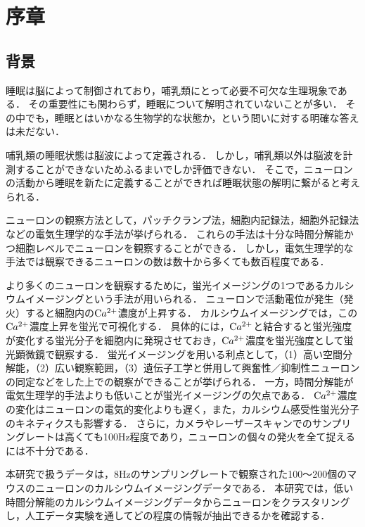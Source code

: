 \chapter{序章}
\section{背景}
睡眠は脳によって制御されており\cite{Hobson2005}，哺乳類にとって必要不可欠な生理現象である．
その重要性にも関わらず，睡眠について解明されていないことが多い．
その中でも，睡眠とはいかなる生物学的な状態か，という問いに対する明確な答えは未だない\cite{Kanda2016}．

哺乳類の睡眠状態は脳波によって定義される．
しかし，哺乳類以外は脳波を計測することができないためふるまいでしか評価できない．
そこで，ニューロンの活動から睡眠を新たに定義することができれば睡眠状態の解明に繋がると考えられる\cite{Kanda2020}．

ニューロンの観察方法として，パッチクランプ法，細胞内記録法，細胞外記録法などの電気生理学的な手法が挙げられる．
これらの手法は十分な時間分解能かつ細胞レベルでニューロンを観察することができる．
しかし，電気生理学的な手法では観察できるニューロンの数は数十から多くても数百程度である．

より多くのニューロンを観察するために，蛍光イメージングの1つであるカルシウムイメージングという手法が用いられる．
ニューロンで活動電位が発生（発火）すると細胞内の$\text Ca^{2+}$濃度が上昇する．
カルシウムイメージングでは，この$\text Ca^{2+}$濃度上昇を蛍光で可視化する．
具体的には，$\text Ca^{2+}$と結合すると蛍光強度が変化する蛍光分子を細胞内に発現させておき，$\text Ca^{2+}$濃度を蛍光強度として蛍光顕微鏡で観察する．
蛍光イメージングを用いる利点として，（1）高い空間分解能，（2）広い観察範囲，（3）遺伝子工学と併用して興奮性／抑制性ニューロンの同定などをした上での観察ができることが挙げられる．
一方，時間分解能が電気生理学的手法よりも低いことが蛍光イメージングの欠点である．
$\text Ca^{2+}$濃度の変化はニューロンの電気的変化よりも遅く，また，カルシウム感受性蛍光分子のキネティクスも影響する．
さらに，カメラやレーザースキャンでのサンプリングレートは高くても100Hz程度であり，ニューロンの個々の発火を全て捉えるには不十分である．

本研究で扱うデータは，8Hzのサンプリングレートで観察された100〜200個のマウスのニューロンのカルシウムイメージングデータである．
本研究では，低い時間分解能のカルシウムイメージングデータからニューロンをクラスタリングし，人工データ実験を通してどの程度の情報が抽出できるかを確認する．
